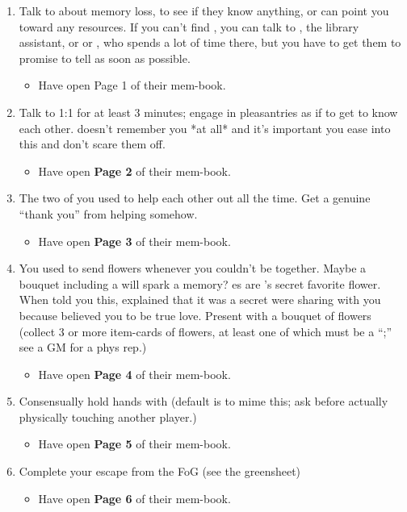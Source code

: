 \documentclass[green]{GL2020}
\begin{document}
\begin{enumerate}
  \item Talk to \cLibrarian{\full} about memory loss, to see if they know anything, or can point you toward any resources. If you can’t find \cLibrarian{}, you can talk to \cLibAssist{\full}, the library assistant, or or \cPresident{\full}, who spends a lot of time there, but you have to get them to promise to tell \cLibrarian{} as soon as possible.
  \begin{itemize}
    \item Have \cHeadScientist{} open Page 1 of their mem-book. 
  \end{itemize}
  \item Talk to \cHeadScientist{} 1:1 for at least 3 minutes; engage in pleasantries as if to get to know each other. \cHeadScientist{} doesn’t remember you *at all* and it’s important you ease into this and don’t scare them off.
  \begin{itemize}
    \item Have \cHeadScientist{} open \textbf{Page 2} of their mem-book.
  \end{itemize}
  \item The two of you used to help each other out all the time. Get a genuine “thank you” from helping \cHeadScientist{} somehow.
  \begin{itemize}
    \item Have \cHeadScientist{} open \textbf{Page 3} of their mem-book.
  \end{itemize}
  \item You used to send \cHeadScientist{} flowers whenever you couldn’t be together. Maybe a bouquet including a \iBlackCrocus{} will spark a memory? \iBlackCrocus{\MYname}es are \cHeadScientist{}’s secret favorite flower. When \cHeadScientist{\they} told you this, \cHeadScientist{\they} explained that it was a secret \cHeadScientist{\they} were sharing with you because \cHeadScientist{} believed you to be \cHeadScientist{\their} true love. Present \cHeadScientist{} with a bouquet of flowers (collect 3 or more item-cards of flowers, at least one of which must be a ``\iBlackCrocus{};'' see a GM for a phys rep.)
  \begin{itemize}
    \item Have \cHeadScientist{} open \textbf{Page 4} of their mem-book.
  \end{itemize}
  \item Consensually hold hands with \cHeadScientist{} (default is to mime this; ask before actually physically touching another player.)
  \begin{itemize}
    \item Have \cHeadScientist{} open \textbf{Page 5} of their mem-book.
  \end{itemize}
  \item Complete your escape from the FoG (see the greensheet)
  \begin{itemize}
    \item Have \cHeadScientist{} open \textbf{Page 6} of their mem-book.
  \end{itemize}
\end{enumerate}
\end{document}
